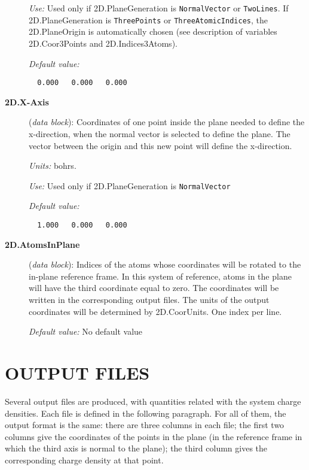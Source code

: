 \begin{description}
{\it Use:} Used only if 2D.PlaneGeneration is {\tt NormalVector} or
{\tt TwoLines}. If 2D.PlaneGeneration is {\tt ThreePoints}
or {\tt ThreeAtomicIndices}, the 2D.PlaneOrigin is
automatically chosen (see description of variables 2D.Coor3Points
and 2D.Indices3Atoms).
    
{\it Default value:} 
\begin{verbatim}
  0.000   0.000   0.000
\end{verbatim}
        
\item[{\bf 2D.X-Axis}] ({\it data block}): 
Coordinates of one point inside the plane needed to define the x-direction,
when the normal vector is selected to define the plane. The vector between 
the origin and this new point will define the x-direction.

{\it Units:} bohrs.

{\it Use:} Used only if 2D.PlaneGeneration is {\tt NormalVector} 
    
{\it Default value:} 
\begin{verbatim}
  1.000   0.000   0.000
\end{verbatim}

\item[{\bf 2D.AtomsInPlane}] ({\it data block}): 
Indices of the atoms whose coordinates will be rotated to the in-plane 
reference frame. In this system of reference, atoms in the plane will have 
the third coordinate equal to zero. 
The coordinates will be written in the corresponding output files. The
units of the output coordinates will be determined by 2D.CoorUnits.
One index per line.

{\it Default value:} No default value 

\end{description}

\section{OUTPUT FILES}
\label{cap:output} 

Several output files are produced, with quantities related
with the system charge densities.
Each file is defined in the following paragraph.
For all of them, the output format is the same: there are three 
columns in each file; the first two columns give the coordinates of the points
in the plane (in the reference frame in which the third axis is normal  
to the plane);
the third column gives the corresponding charge density at that
point.

